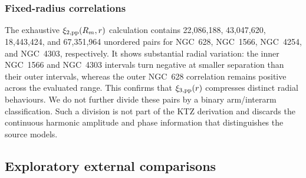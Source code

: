 \documentclass[fleqn,usenatbib]{mnras}
\begin{document}
\subsubsection{Fixed-radius correlations}
\label{sssec:phangs_xi2_results}

The exhaustive $\xi_{2,{\rm pp}}(R_m,r)$ calculation contains 22,086,188, 43,047,620, 18,443,424, and 67,351,964 unordered pairs for NGC~628, NGC~1566, NGC~4254, and NGC~4303, respectively.  It shows substantial radial variation: the inner NGC~1566 and NGC~4303 intervals turn negative at smaller separation than their outer intervals, whereas the outer NGC~628 correlation remains positive across the evaluated range.  This confirms that $\xi_{3,{\rm pp}}(r)$ compresses distinct radial behaviours.  We do not further divide these pairs by a binary arm/interarm classification.  Such a division is not part of the KTZ derivation and discards the continuous harmonic amplitude and phase information that distinguishes the source models.

\subsection{Exploratory external comparisons}
\label{ssec:phangs_physical_checks}
\end{document}

